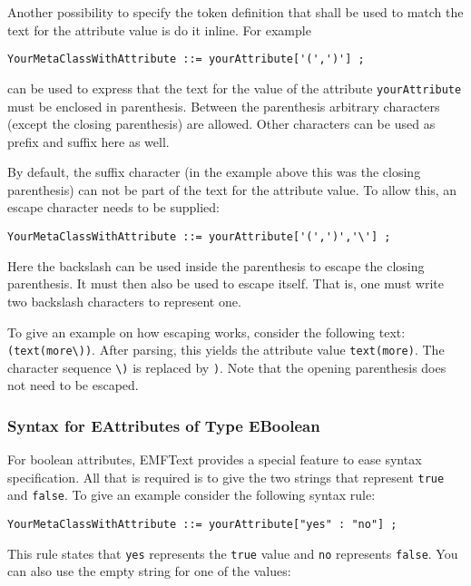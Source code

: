 Another possibility to specify the token definition that shall be used to match 
the text for the attribute value is do it inline. For example

\begin{lstlisting}
YourMetaClassWithAttribute ::= yourAttribute['(',')'] ;
\end{lstlisting}

can be used to express that the text for the value of the attribute
\texttt{yourAttribute} must be enclosed in parenthesis. Between the parenthesis 
arbitrary characters (except the closing 
parenthesis) are allowed. Other characters can be used as prefix and suffix here as 
well.

By default, the suffix character (in the example above this was the closing 
parenthesis) can not be part of the text for the attribute value. To allow this, 
an escape character needs to be supplied:

\begin{lstlisting}
YourMetaClassWithAttribute ::= yourAttribute['(',')','\'] ;
\end{lstlisting}

Here the backslash can be used inside the parenthesis to escape the closing 
parenthesis. It must then also be used to escape itself. That is, one must
write two backslash characters to represent one. 

To give an example on how escaping works, consider the following text:
\texttt{(text(more\textbackslash{}))}. After parsing, this yields the attribute
value \texttt{text(more)}. The character sequence \texttt{\textbackslash{})} is
replaced by \texttt{)}. Note that the opening parenthesis does not need to be
escaped.

\subsubsection{Syntax for EAttributes of Type EBoolean}

For boolean attributes, EMFText provides a special feature to ease syntax
specification. All that is required is to give the two strings that represent
\texttt{true} and \texttt{false}. To give an example consider the following
syntax rule:

\begin{lstlisting}
YourMetaClassWithAttribute ::= yourAttribute["yes" : "no"] ;
\end{lstlisting}

This rule states that \texttt{yes} represents the \texttt{true} value and
\texttt{no} represents \texttt{false}. You can also use the empty string for
one of the values:

